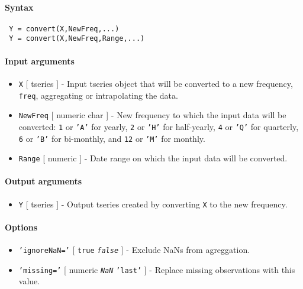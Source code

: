 


	\paragraph{Syntax}
 
 \begin{verbatim}
 Y = convert(X,NewFreq,...)
 Y = convert(X,NewFreq,Range,...)
 \end{verbatim}
 
 \paragraph{Input arguments}
 
 \begin{itemize}
 \item
   \texttt{X} {[} tseries {]} - Input tseries object that will be
   converted to a new frequency, \texttt{freq}, aggregating or
   intrapolating the data.
 \item
   \texttt{NewFreq} {[} numeric \textbar{} char {]} - New frequency to
   which the input data will be converted: \texttt{1} or \texttt{'A'} for
   yearly, \texttt{2} or \texttt{'H'} for half-yearly, \texttt{4} or
   \texttt{'Q'} for quarterly, \texttt{6} or \texttt{'B'} for bi-monthly,
   and \texttt{12} or \texttt{'M'} for monthly.
 \item
   \texttt{Range} {[} numeric {]} - Date range on which the input data
   will be converted.
 \end{itemize}
 
 \paragraph{Output arguments}
 
 \begin{itemize}
 \item
   \texttt{Y} {[} tseries {]} - Output tseries created by converting
   \texttt{X} to the new frequency.
 \end{itemize}
 
 \paragraph{Options}
 
 \begin{itemize}
 \item
   \texttt{'ignoreNaN='} {[} \texttt{true} \textbar{}
   \emph{\texttt{false}} {]} - Exclude NaNs from agreggation.
 \item
   \texttt{'missing='} {[} numeric \textbar{} \emph{\texttt{NaN}}
   \textbar{} \texttt{'last'} {]} - Replace missing observations with
   this value.
 \end{itemize}
 
